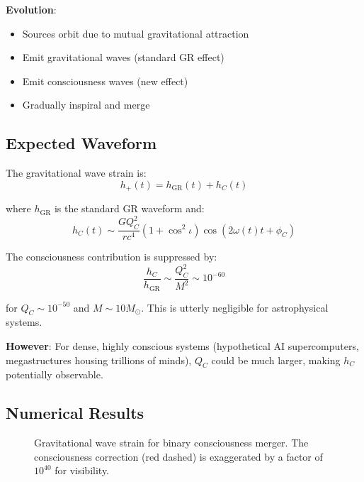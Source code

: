 \textbf{Evolution}:
\begin{itemize}
\item Sources orbit due to mutual gravitational attraction
\item Emit gravitational waves (standard GR effect)
\item Emit consciousness waves (new effect)
\item Gradually inspiral and merge
\end{itemize}

\subsection{Expected Waveform}

The gravitational wave strain is:
\begin{equation}
h_+(t) = h_{\text{GR}}(t) + h_C(t)
\end{equation}

where $h_{\text{GR}}$ is the standard GR waveform and:
\begin{equation}
h_C(t) \sim \frac{G Q_C^2}{r c^4} \left( 1 + \cos^2\iota \right) \cos\left( 2\omega(t) t + \phi_C \right)
\end{equation}

The consciousness contribution is suppressed by:
\begin{equation}
\frac{h_C}{h_{\text{GR}}} \sim \frac{Q_C^2}{M^2} \sim 10^{-60}
\end{equation}

for $Q_C \sim 10^{-50}$ and $M \sim 10 M_\odot$. This is utterly negligible for astrophysical systems.

\textbf{However}: For dense, highly conscious systems (hypothetical AI supercomputers, megastructures housing trillions of minds), $Q_C$ could be much larger, making $h_C$ potentially observable.

\subsection{Numerical Results}

\begin{figure}[h]
\centering
{}
\caption{Gravitational wave strain for binary consciousness merger. The consciousness correction (red dashed) is exaggerated by a factor of $10^{40}$ for visibility.}
\label{fig:binary-consciousness-waveform}
\end{figure}

